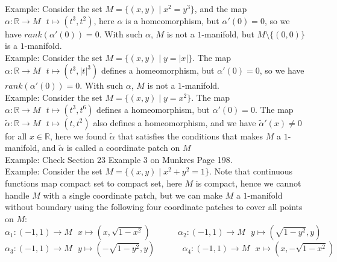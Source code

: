 \documentclass[15pt]{book}
\theoremstyle{break}
\theoremstyle{break}
\newcommand{\R}{\mathbb{R}}
\newcommand{\example}{\color{green}Example: \color{black}}
\begin{document}
\example Consider the set $M = \{(x,y) \mid x^2 = y^3\}$, and the map $\alpha:\R \to M \ \ \ t \mapsto (t^3,t^2)$, here $\alpha $ is a homeomorphism, but $\alpha'(0) = 0$, so we have $rank(\alpha'(0)) = 0$. With such $\alpha$, $M$ is not a $1$-manifold, but $M \setminus \{(0,0)\}$ is a $1$-manifold. \\

\example Consider the set $M = \{(x,y) \mid y=|x| \}$. The map $\alpha:\R \to M \ \ \ t\mapsto (t^3, |t|^3)$ defines a homeomorphism, but $\alpha'(0) = 0$, so we have $rank(\alpha'(0)) = 0$. With such $\alpha$, $M$ is not a $1$-manifold. \\

\example Consider the set $M = \{(x,y) \mid y = x^2\}$. The map $\alpha:\R \to M \ \ \ t\mapsto (t^3,t^6)$ defines a homeomorphism, but $\alpha'(0) = 0$. The map $\widetilde{\alpha}:\R \to M \ \ \ t\mapsto (t,t^2)$ also defines a homeomorphism, and we have $\widetilde{\alpha}'(x) \neq 0$ for all $x \in \R$, here we found $\widetilde{\alpha}$ that satisfies the conditions that makes $M$ a $1$-manifold, and $\widetilde{\alpha}$ is called a coordinate patch on $M$\\

\example Check Section 23 Example 3 on Munkres Page 198.\\

\example Consider the set $M = \{(x,y) \mid x^2+y^2 = 1\}$. Note that continuous functions map compact set to compact set, here $M$ is compact, hence we cannot handle $M$ with a single coordinate patch, but we can make $M$ a $1$-manifold without boundary using the following four coordinate patches to cover all points on $M$:
$$\alpha_1: (-1,1) \to M \ \ \  x\mapsto \left(x,\sqrt{1-x^2}\right) \qquad\ \quad \alpha_2: (-1,1) \to M \ \ \  y\mapsto \left(\sqrt{1-y^2},y\right) $$
$$\alpha_3: (-1,1) \to M \ \ \  y\mapsto \left(-\sqrt{1-y^2},y\right)\qquad\ \quad \alpha_4: (-1,1) \to M \ \ \  x\mapsto \left(x,-\sqrt{1-x^2}\right)$$
\newpage
\end{document}
